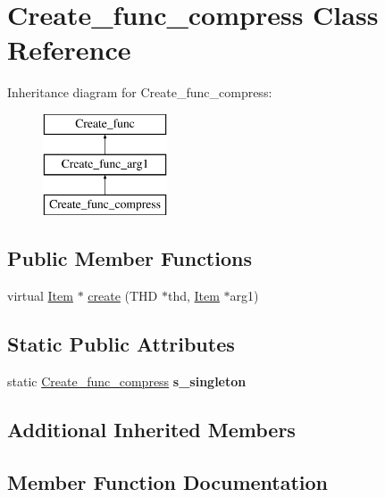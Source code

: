 \hypertarget{classCreate__func__compress}{}\section{Create\+\_\+func\+\_\+compress Class Reference}
\label{classCreate__func__compress}
Inheritance diagram for Create\+\_\+func\+\_\+compress\+:\begin{figure}[H]
\begin{center}
\leavevmode
\includegraphics[height=3.000000cm]{classCreate__func__compress}
\end{center}
\end{figure}
\subsection*{Public Member Functions}
\begin{DoxyCompactItemize}
\item 
virtual \mbox{\hyperlink{classItem}{Item}} $\ast$ \mbox{\hyperlink{classCreate__func__compress_af36992a04fb5529677e9a2d493757841}{create}} (T\+HD $\ast$thd, \mbox{\hyperlink{classItem}{Item}} $\ast$arg1)
\end{DoxyCompactItemize}
\subsection*{Static Public Attributes}
\begin{DoxyCompactItemize}
\item 
\mbox{\label{classCreate__func__compress_a7fda378fb65e8b8eddcf89edfaf3df62}} 
static \mbox{\hyperlink{classCreate__func__compress}{Create\+\_\+func\+\_\+compress}} {\bfseries s\+\_\+singleton}
\end{DoxyCompactItemize}
\subsection*{Additional Inherited Members}


\subsection{Member Function Documentation}
\mbox{\label{classCreate__func__compress_af36992a04fb5529677e9a2d493757841}} 
